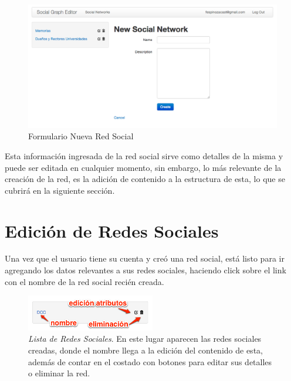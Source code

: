 \begin{figure}[H]
  \centering
  \includegraphics[width=1.0\textwidth]{images/new_social_network.png}
  \caption{Formulario Nueva Red Social}
  \label{new_social_network}
\end{figure}

Esta información ingresada de la red social sirve como detalles de la misma y puede ser editada en cualquier momento, sin embargo, lo más relevante de la creación de la red, es la adición de contenido a la estructura de esta, lo que se cubrirá en la siguiente sección.


\section{Edición de Redes Sociales} %
\label{sec:edicion_de_redes_sociales}

Una vez que el usuario tiene su cuenta y creó una red social, está listo para ir agregando los datos relevantes a sus redes sociales, haciendo click sobre el link con el nombre de la red social recién creada.

\begin{figure}[H]
  \centering
  \includegraphics[width=0.5\textwidth]{images/lista_redes_sociales.png}
  \caption[Lista de Redes Sociales]{\emph{Lista de Redes Sociales}. En este lugar aparecen las redes sociales creadas, donde el nombre llega a la edición del contenido de esta, además de contar en el costado con botones para editar sus detalles o eliminar la red.}
  \label{lista_redes_sociales}
\end{figure}

